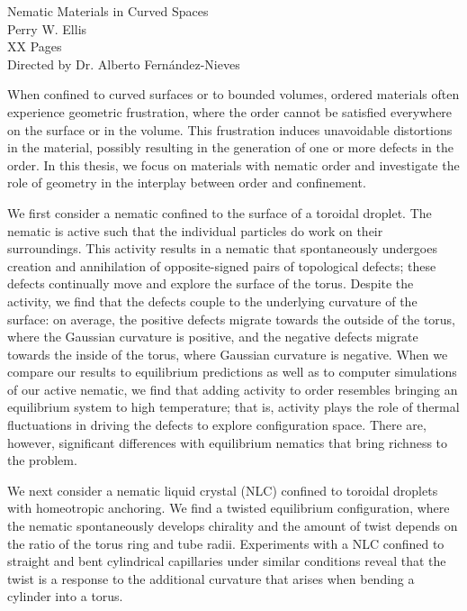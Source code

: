 \documentclass[11pt]{article}   %
\begin{document}
\onehalfspacing
\begin{centering}
Nematic Materials in Curved Spaces \\[11 pt]

Perry W. Ellis \\[11 pt]

XX Pages \\[11 pt]

Directed by Dr. Alberto Fern\'andez-Nieves \\[22 pt]
\end{centering}
When confined to curved surfaces or to bounded volumes, ordered materials often experience geometric frustration, where the order cannot be satisfied everywhere on the surface or in the volume.
This frustration induces unavoidable distortions in the material, possibly resulting in the generation of one or more defects in the order.
In this thesis, we focus on materials with nematic order and investigate the role of geometry in the interplay between order and confinement.

We first consider a nematic confined to the surface of a toroidal droplet.
The nematic is active such that the individual particles do work on their surroundings.
This activity results in a nematic that spontaneously undergoes creation and annihilation of opposite-signed pairs of topological defects; these defects continually move and explore the surface of the torus.
Despite the activity, we find that the defects couple to the underlying curvature of the surface: on average, the positive defects migrate towards the outside of the torus, where the Gaussian curvature is positive, and the negative defects migrate towards the inside of the torus, where Gaussian curvature is negative.
When we compare our results to equilibrium predictions as well as to computer simulations of our active nematic, we find that adding activity to order resembles bringing an equilibrium system to high temperature; that is, activity plays the role of thermal fluctuations in driving the defects to explore configuration space.
There are, however, significant differences with equilibrium nematics that bring richness to the problem.

We next consider a nematic liquid crystal (NLC) confined to toroidal droplets with homeotropic anchoring.
We find a twisted equilibrium configuration, where the nematic spontaneously develops chirality and the amount of twist depends on the ratio of the torus ring and tube radii.
Experiments with a NLC confined to straight and bent cylindrical capillaries under similar conditions reveal that the twist is a response to the additional curvature that arises when bending a cylinder into a torus.
\end{document}
